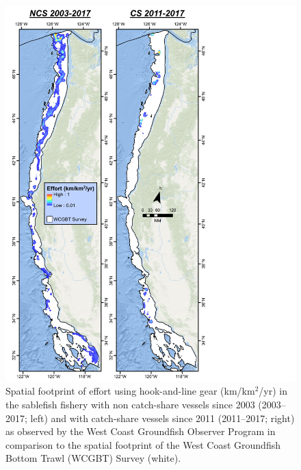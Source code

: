 \documentclass[11pt,
  english,
  a4paper,
]{article}
\begin{document}
\begin{figure}
\centering
\includegraphics[width=1\textwidth,height=1\textheight]{figs/Sablefish_Figures_HKL_lnDens_2views_avg.pdf}
\caption{Spatial footprint of effort using hook-and-line gear (km/km{\(^2\)\leavevmode\tagmcend\tagstructend}/yr) in the sablefish fishery with non catch-share vessels since 2003 (2003--2017; left) and with catch-share vessels since 2011 (2011--2017; right) as observed by the West Coast Groundfish Observer Program in comparison to the spatial footprint of the West Coast Groundfish Bottom Trawl (WCGBT) Survey (white).\label{fig:footprint_hkl}}
\end{figure}

\tagmcend\tagstructend

\end{document}
